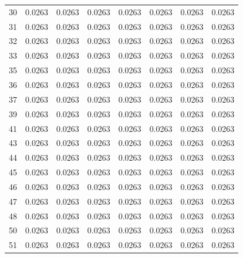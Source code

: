 \begin{table}[H]
\begin{tabular}{rrrrrrrr}
30 & 0.0263 & 0.0263 & 0.0263 & 0.0263 & 0.0263 & 0.0263 & 0.0263 \\
31 & 0.0263 & 0.0263 & 0.0263 & 0.0263 & 0.0263 & 0.0263 & 0.0263 \\
32 & 0.0263 & 0.0263 & 0.0263 & 0.0263 & 0.0263 & 0.0263 & 0.0263 \\
33 & 0.0263 & 0.0263 & 0.0263 & 0.0263 & 0.0263 & 0.0263 & 0.0263 \\
35 & 0.0263 & 0.0263 & 0.0263 & 0.0263 & 0.0263 & 0.0263 & 0.0263 \\
36 & 0.0263 & 0.0263 & 0.0263 & 0.0263 & 0.0263 & 0.0263 & 0.0263 \\
37 & 0.0263 & 0.0263 & 0.0263 & 0.0263 & 0.0263 & 0.0263 & 0.0263 \\
39 & 0.0263 & 0.0263 & 0.0263 & 0.0263 & 0.0263 & 0.0263 & 0.0263 \\
41 & 0.0263 & 0.0263 & 0.0263 & 0.0263 & 0.0263 & 0.0263 & 0.0263 \\
43 & 0.0263 & 0.0263 & 0.0263 & 0.0263 & 0.0263 & 0.0263 & 0.0263 \\
44 & 0.0263 & 0.0263 & 0.0263 & 0.0263 & 0.0263 & 0.0263 & 0.0263 \\
45 & 0.0263 & 0.0263 & 0.0263 & 0.0263 & 0.0263 & 0.0263 & 0.0263 \\
46 & 0.0263 & 0.0263 & 0.0263 & 0.0263 & 0.0263 & 0.0263 & 0.0263 \\
47 & 0.0263 & 0.0263 & 0.0263 & 0.0263 & 0.0263 & 0.0263 & 0.0263 \\
48 & 0.0263 & 0.0263 & 0.0263 & 0.0263 & 0.0263 & 0.0263 & 0.0263 \\
50 & 0.0263 & 0.0263 & 0.0263 & 0.0263 & 0.0263 & 0.0263 & 0.0263 \\
51 & 0.0263 & 0.0263 & 0.0263 & 0.0263 & 0.0263 & 0.0263 & 0.0263 \\
\bottomrule
\end{tabular}
\end{table}
